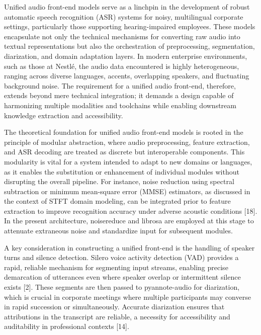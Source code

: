 \documentclass[12pt,a4paper]{article}
\begin{document}
Unified audio front-end models serve as a linchpin in the development of robust automatic speech recognition (ASR) systems for noisy, multilingual corporate settings, particularly those supporting hearing-impaired employees. These models encapsulate not only the technical mechanisms for converting raw audio into textual representations but also the orchestration of preprocessing, segmentation, diarization, and domain adaptation layers. In modern enterprise environments, such as those at Nestlé, the audio data encountered is highly heterogeneous, ranging across diverse languages, accents, overlapping speakers, and fluctuating background noise. The requirement for a unified audio front-end, therefore, extends beyond mere technical integration; it demands a design capable of harmonizing multiple modalities and toolchains while enabling downstream knowledge extraction and accessibility.


The theoretical foundation for unified audio front-end models is rooted in the principle of modular abstraction, where audio preprocessing, feature extraction, and ASR decoding are treated as discrete but interoperable components. This modularity is vital for a system intended to adapt to new domains or languages, as it enables the substitution or enhancement of individual modules without disrupting the overall pipeline. For instance, noise reduction using spectral subtraction or minimum mean-square error (MMSE) estimators, as discussed in the context of STFT domain modeling, can be integrated prior to feature extraction to improve recognition accuracy under adverse acoustic conditions [18]. In the present architecture, noisereduce and librosa are employed at this stage to attenuate extraneous noise and standardize input for subsequent modules.


A key consideration in constructing a unified front-end is the handling of speaker turns and silence detection. Silero voice activity detection (VAD) provides a rapid, reliable mechanism for segmenting input streams, enabling precise demarcation of utterances even where speaker overlap or intermittent silence exists [2]. These segments are then passed to pyannote-audio for diarization, which is crucial in corporate meetings where multiple participants may converse in rapid succession or simultaneously. Accurate diarization ensures that attributions in the transcript are reliable, a necessity for accessibility and auditability in professional contexts [14].
\end{document}
